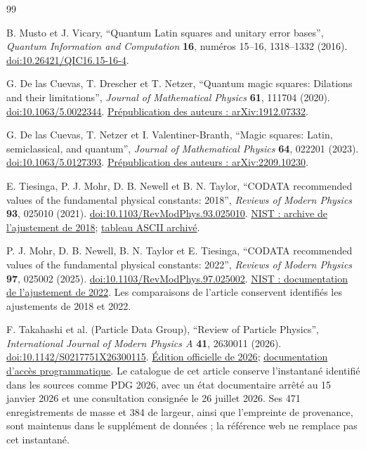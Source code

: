 \begin{thebibliography}{99}
\setlength{\itemsep}{0.10\baselineskip}
{}

B. Musto et J. Vicary,
``Quantum Latin squares and unitary error bases'',
\emph{Quantum Information and Computation} \textbf{16},
numéros 15--16, 1318--1332 (2016).
\href{https://doi.org/10.26421/QIC16.15-16-4}{doi:10.26421/QIC16.15-16-4}.

G. De las Cuevas, T. Drescher et T. Netzer,
``Quantum magic squares: Dilations and their limitations'',
\emph{Journal of Mathematical Physics} \textbf{61}, 111704 (2020).
\href{https://doi.org/10.1063/5.0022344}{doi:10.1063/5.0022344}.
\href{https://arxiv.org/abs/1912.07332}{Prépublication des auteurs : arXiv:1912.07332}.

G. De las Cuevas, T. Netzer et I. Valentiner-Branth,
``Magic squares: Latin, semiclassical, and quantum'',
\emph{Journal of Mathematical Physics} \textbf{64}, 022201 (2023).
\href{https://doi.org/10.1063/5.0127393}{doi:10.1063/5.0127393}.
\href{https://arxiv.org/abs/2209.10230}{Prépublication des auteurs : arXiv:2209.10230}.

E. Tiesinga, P. J. Mohr, D. B. Newell et B. N. Taylor,
``CODATA recommended values of the fundamental physical constants: 2018'',
\emph{Reviews of Modern Physics} \textbf{93}, 025010 (2021).
\href{https://doi.org/10.1103/RevModPhys.93.025010}{doi:10.1103/RevModPhys.93.025010}.
\href{https://physics.nist.gov/cuu/Constants/archive2018.html}{NIST : archive de l’ajustement de 2018};
\href{https://physics.nist.gov/cuu/Constants/ArchiveASCII/allascii_2018.txt}{tableau ASCII archivé}.

P. J. Mohr, D. B. Newell, B. N. Taylor et E. Tiesinga,
``CODATA recommended values of the fundamental physical constants: 2022'',
\emph{Reviews of Modern Physics} \textbf{97}, 025002 (2025).
\href{https://doi.org/10.1103/RevModPhys.97.025002}{doi:10.1103/RevModPhys.97.025002}.
\href{https://physics.nist.gov/cuu/Constants/article2022.html}{NIST : documentation de l’ajustement de 2022}.
Les comparaisons de l’article conservent identifiés les ajustements de 2018 et 2022.

F. Takahashi et al. (Particle Data Group),
``Review of Particle Physics'',
\emph{International Journal of Modern Physics A} \textbf{41}, 2630011 (2026).
\href{https://doi.org/10.1142/S0217751X26300115}{doi:10.1142/S0217751X26300115}.
\href{https://pdg.lbl.gov/2026/}{Édition officielle de 2026};
\href{https://pdg.lbl.gov/2026/api/index.html}{documentation d’accès programmatique}.
Le catalogue de cet article conserve l’instantané identifié dans les sources
comme PDG 2026, avec un état documentaire arrêté au 15 janvier 2026 et une consultation consignée
le 26 juillet 2026. Ses 471 enregistrements de masse et 384 de largeur, ainsi que
l’empreinte de provenance, sont maintenus dans le supplément de données ; la référence
web ne remplace pas cet instantané.

\end{thebibliography}
